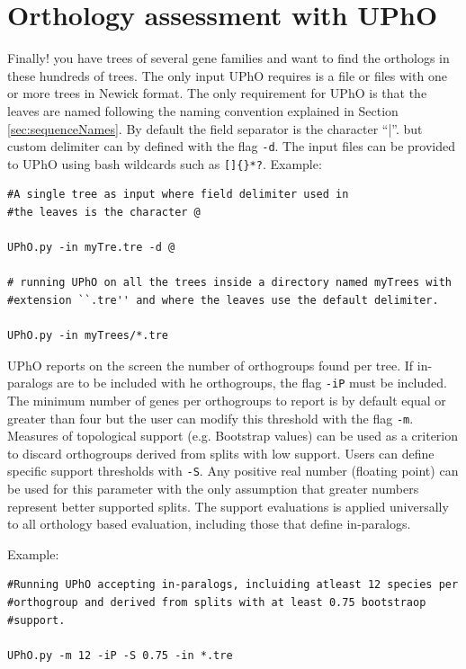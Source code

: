 \documentclass[10pt]{article}
\begin{document}
\section{Orthology assessment with UPhO} Finally! you have trees of
several gene families and want to find the orthologs in these hundreds
of trees. The only input UPhO requires is a file or files with one or
more trees in Newick format. The only requirement for UPhO is that the leaves
are named following the naming convention explained in Section
\ref{sec:sequenceNames}. By default the field separator is the
character ``|''.  but custom delimiter can by defined with the flag \texttt{-d}. The
input files can be provided to UPhO using bash wildcards such as
\texttt{[]\{\}*?}. Example:

\begin{verbatim} 
#A single tree as input where field delimiter used in
#the leaves is the character @ 

UPhO.py -in myTre.tre -d @

# running UPhO on all the trees inside a directory named myTrees with
#extension ``.tre'' and where the leaves use the default delimiter.

UPhO.py -in myTrees/*.tre

\end{verbatim}

UPhO reports on the screen the number of orthogroups found per
tree. If in-paralogs are to be included with he orthogroups, the flag
\texttt{-iP} must be included. The minimum number of genes  per  orthogroups to
report is by default equal or greater than four but the user can modify
this threshold with the flag \texttt{-m}. Measures of topological
support (e.g. Bootstrap values) can be used as a criterion to discard
orthogroups derived from splits with low support. Users can define
specific support thresholds with \texttt{-S}. Any positive real number
(floating point) can be used for this parameter with the only assumption that greater
numbers represent better supported splits. The support evaluations is
applied universally to all orthology based evaluation, including those
that define in-paralogs.

Example:
\begin{verbatim} 
#Running UPhO accepting in-paralogs, incluiding atleast 12 species per
#orthogroup and derived from splits with at least 0.75 bootstraop
#support.

UPhO.py -m 12 -iP -S 0.75 -in *.tre

\end{verbatim}
 
\end{document}
